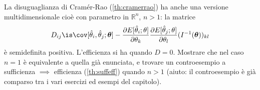 \begin{exercise} \label{ex:cramerraond}
    La disuguaglianza di Cramér-Rao (\autoref{th:cramerrao}) ha anche una
    versione multidimensionale cioè con parametro in $\mathbb R^n$, $n > 1$:
    la matrice
    \begin{equation*}
        D_{ij} \is
        \cov[\hat\theta_i, \hat\theta_j;\boldsymbol\theta] -
        \frac{\partial E[\hat\theta_i;\theta]}{\partial\theta_k}
        \frac{\partial E[\hat\theta_j;\theta]}{\partial\theta_l}
        (I^{-1}(\boldsymbol\theta))_{kl}
    \end{equation*}
    è semidefinita positiva. L'efficienza si ha quando $D = 0$. Mostrare che
    nel caso $n = 1$ è equivalente a quella già enunciata, e trovare un
    controesempio a sufficienza $\implies$ efficienza (\autoref{th:suffeff})
    quando $n > 1$ (aiuto: il controesempio è già comparso tra i vari esercizi
    ed esempi del capitolo).
\end{exercise}

